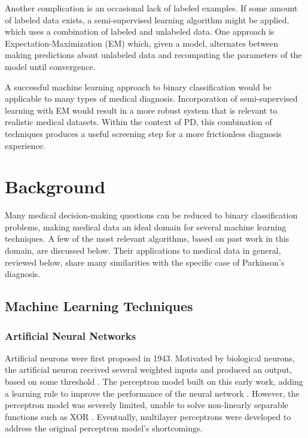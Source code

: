 \documentclass[draftcopy]{srpaper}
\begin{document}
Another complication is an occasional lack of
labeled examples. If some amount of labeled data exists, a
semi-supervised learning algorithm might be applied, which uses
a combination of labeled and unlabeled data. One approach is Expectation-Maximization
(EM) which, given a model, alternates between making predictions about unlabeled data and
recomputing the parameters of the model until convergence.

A successful machine learning approach to binary classification would
be applicable to many types of medical diagnosis. Incorporation of
semi-supervised learning with EM would result in a more robust system
that is relevant to realistic medical datasets. Within the context of
PD, this combination of techniques produces a useful screening step
for a more frictionless diagnosis experience. 

\chapter{Background}
\label{Chapter:Two}
Many medical
decision-making questions can be reduced to binary
classification problems, making medical data an ideal domain for
several machine learning techniques. A few of the most relevant
algorithms, based on past work in this domain, are discussed
below. Their applications to medical data in general, reviewed below,
share many similarities with the specific case of
Parkinson's diagnosis.

\section{Machine Learning Techniques}
\subsection{Artificial Neural Networks}
Artificial neurons were first proposed in 1943. Motivated by biological neurons, the artificial neuron received
several weighted inputs and produced an output, based on some
threshold \cite{MP43}. The perceptron model built on this early
work, adding a learning rule to improve the performance of the neural
network \cite{Ros58}. However, the perceptron model was severely limited, unable to
solve non-linearly separable functions such as XOR \cite{MP69}. Eventually, multilayer perceptrons were developed to
address the original perceptron model's shortcomings. 
\end{document}
